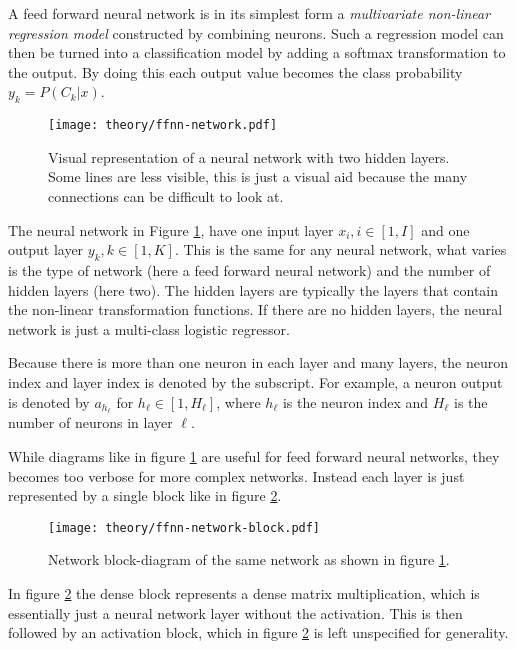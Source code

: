 A feed forward neural network is in its simplest form a \textit{multivariate non-linear regression model} constructed by combining neurons. Such a regression model can then be turned into a classification model by adding a softmax transformation \cite{the-elements-of-statistical-learning} to the output. By doing this each output value becomes the class probability $y_k = P(C_k | x)$.

\begin{figure}[h]
	\centering
	\texttt{[image: theory/ffnn-network.pdf]}
	\caption{Visual representation of a neural network with two hidden layers. Some lines are less visible, this is just a visual aid because the many connections can be difficult to look at.}
	\label{fig:theory:ffnn:network}
\end{figure}

The neural network in Figure \ref{fig:theory:ffnn:network}, have one input layer $x_i, i \in [1, I]$ and one output layer $y_k, k \in [1, K]$. This is the same for any neural network, what varies is the type of network (here a feed forward neural network) and the number of hidden layers (here two). The hidden layers are typically the layers that contain the non-linear transformation functions. If there are no hidden layers, the neural network is just a multi-class logistic regressor\cite{bishop}.

Because there is more than one neuron in each layer and many layers, the neuron index and layer index is denoted by the subscript. For example, a neuron output is denoted by $a_{h_{\ell}}$ for $h_{\ell} \in [1, H_{\ell}]$, where $h_{\ell}$ is the neuron index and $H_\ell$ is the number of neurons in layer $\ell$.

While diagrams like in figure \ref{fig:theory:ffnn:network} are useful for feed forward neural networks, they becomes too verbose for more complex networks. Instead each layer is just represented by a single block like in figure \ref{fig:theory:ffnn:network-block}.

\begin{figure}[h]
	\centering
	\texttt{[image: theory/ffnn-network-block.pdf]}
	\caption{Network block-diagram of the same network as shown in figure \ref{fig:theory:ffnn:network}.}
	\label{fig:theory:ffnn:network-block}
\end{figure}

In figure \ref{fig:theory:ffnn:network-block} the dense block represents a dense matrix multiplication, which is essentially just a neural network layer without the activation. This is then followed by an activation block, which in figure \ref{fig:theory:ffnn:network-block} is left unspecified for generality.

